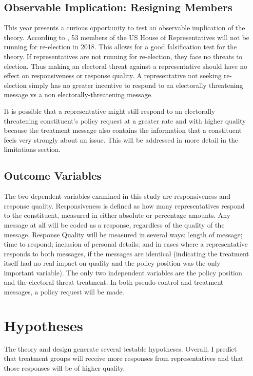 \documentclass[12pt]{article}\usepackage[]{graphicx}\usepackage[]{color}
\begin{document}
\subsection{Observable Implication: Resigning Members}
This year presents a curious opportunity to test an observable implication of the theory. According to \cite{Ballotpedia:2018aa}, 53 members of the US House of Representatives will not be running for re-election in 2018. This allows for a good falsification test for the theory. If representatives are not running for re-election, they face no threats to election. Thus making an electoral threat against a representative should have no effect on responsiveness or response quality. A representative not seeking re-election simply has no greater incentive to respond to an electorally threatening message vs a non electorally-threatening message.

It is possible that a representative might still respond to an electorally threatening constituent's policy request at a greater rate and with higher quality because the treatment message also contains the information that a constituent feels very strongly about an issue. This will be addressed in more detail in the limitations section.

\subsection{Outcome Variables}
The two dependent variables examined in this study are responsiveness and response quality. Responsiveness is defined as how many representatives respond to the constituent, measured in either absolute or percentage amounts. Any message at all will be coded as a response, regardless of the quality of the message. Response Quality will be measured in several ways: length of message; time to respond; inclusion of personal details; and in cases where a representative responds to both messages, if the messages are identical (indicating the treatment itself had no real impact on quality and the policy position was the only important variable). The only two independent variables are the policy position and the electoral threat treatment. In both pseudo-control and treatment messages, a policy request will be made.

\section{Hypotheses}
The theory and design generate several testable hypotheses. Overall, I predict that treatment groups will receive more responses from representatives and that those responses will be of higher quality.
\end{document}
